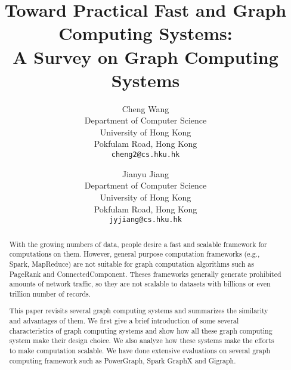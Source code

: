 \documentclass{acm_proc_article}
\newcommand{\eg}[0]{e.g.,}
\begin{document}
%

\title{Toward Practical Fast and Graph Computing Systems: \\A Survey on Graph Computing Systems}
%

\author{
Cheng Wang\\
Department of Computer Science\\
University of Hong Kong\\
Pokfulam Road, Hong Kong\\
\texttt{cheng2@cs.hku.hk}
\and Jianyu Jiang\\
Department of Computer Science\\
University of Hong Kong \\
Pokfulam Road, Hong Kong \\
\texttt{jyjiang@cs.hku.hk}
}


%

\maketitle

\begin{abstract}
With the growing numbers of data, people desire a fast and scalable framework
for computations on them. However, general purpose computation
frameworks (\eg{} Spark, MapReduce)
are not suitable for graph computation algorithms such as PageRank and
ConnectedComponent. Theses frameworks generally generate prohibited amounts
of network traffic, so they are not scalable to datasets with billions or
even trillion number of records.

This paper revisits several graph computing systems and summarizes the similarity
and advantages of them. We first give a
brief introduction of some several characteristics of graph computing
systems and show how all these graph computing system make their design choice.
We also analyze how these systems make the efforts to
make computation scalable. We have done extensive evaluations on several graph
computing framework such as PowerGraph, Spark GraphX and Gigraph.
\end{abstract}
\end{document}
